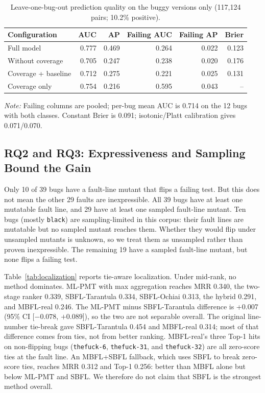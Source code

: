 \documentclass[10pt,conference]{IEEEtran}
\begin{document}
\begin{table}[t]
\centering
\caption{Leave-one-bug-out prediction quality on the buggy versions only (117,124 pairs; 10.2\% positive).}
\label{tab:prediction}
\footnotesize
\begin{tabular}{lrrrrr}
\toprule
Configuration & AUC & AP & Failing AUC & Failing AP & Brier \\
\midrule
Full model & 0.777 & 0.469 & 0.264 & 0.022 & 0.123 \\
Without coverage & 0.705 & 0.247 & 0.238 & 0.020 & 0.176 \\
Coverage + baseline & 0.712 & 0.275 & 0.221 & 0.025 & 0.131 \\
Coverage only & 0.754 & 0.216 & 0.595 & 0.043 & -- \\
\bottomrule
\end{tabular}

\vspace{2mm}
\parbox{0.95\columnwidth}{\footnotesize
\textit{Note:} Failing columns are pooled; per-bug mean AUC is 0.714 on the 12 bugs with both classes. Constant Brier is 0.091; isotonic/Platt calibration gives 0.071/0.070.
}
\end{table}

\subsection{RQ2 and RQ3: Expressiveness and Sampling Bound the Gain}

Only 10 of 39 bugs have a fault-line mutant that flips a failing test. But this does not mean the other 29 faults are inexpressible. All 39 bugs have at least one mutatable fault line, and 29 have at least one sampled fault-line mutant. Ten bugs (mostly \texttt{black}) are sampling-limited in this corpus: their fault lines are mutatable but no sampled mutant reaches them. Whether they would flip under unsampled mutants is unknown, so we treat them as unsampled rather than proven inexpressible. The remaining 19 have a sampled fault-line mutant, but none flips a failing test.

Table~\ref{tab:localization} reports tie-aware localization. Under mid-rank, no method dominates. ML-PMT with max aggregation reaches MRR 0.340, the two-stage ranker 0.339, SBFL-Tarantula 0.334, SBFL-Ochiai 0.313, the hybrid 0.291, and MBFL-real 0.246. The ML-PMT minus SBFL-Tarantula difference is +0.007 (95\% CI [$-0.078$, $+0.089$]), so the two are not separable overall. The original line-number tie-break gave SBFL-Tarantula 0.454 and MBFL-real 0.314; most of that difference comes from ties, not from better ranking. MBFL-real's three Top-1 hits on non-flipping bugs (\texttt{thefuck-6}, \texttt{thefuck-31}, and \texttt{thefuck-32}) are all zero-score ties at the fault line. An MBFL+SBFL fallback, which uses SBFL to break zero-score ties, reaches MRR 0.312 and Top-1 0.256: better than MBFL alone but below ML-PMT and SBFL. We therefore do not claim that SBFL is the strongest method overall.
\end{document}
